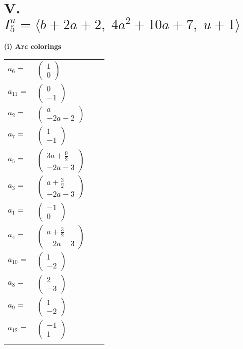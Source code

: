 \documentclass[1p]{elsarticle_modified}
\theoremstyle{definition}
\begin{document}
\centering \section*{V. $I^u_{5}= \langle b+2 a+2,\;4 a^2+10 a+7,\;u+1 \rangle$}
\flushleft \textbf{(i) Arc colorings}\\
\begin{tabular}{m{7pt} m{180pt} m{7pt} m{180pt} }
\flushright $a_{6}=$&$\begin{pmatrix}1\\0\end{pmatrix}$ \\
\flushright $a_{11}=$&$\begin{pmatrix}0\\-1\end{pmatrix}$ \\
\flushright $a_{2}=$&$\begin{pmatrix}a\\-2 a-2\end{pmatrix}$ \\
\flushright $a_{7}=$&$\begin{pmatrix}1\\-1\end{pmatrix}$ \\
\flushright $a_{5}=$&$\begin{pmatrix}3 a+\frac{9}{2}\\-2 a-3\end{pmatrix}$ \\
\flushright $a_{3}=$&$\begin{pmatrix}a+\frac{3}{2}\\-2 a-3\end{pmatrix}$ \\
\flushright $a_{1}=$&$\begin{pmatrix}-1\\0\end{pmatrix}$ \\
\flushright $a_{4}=$&$\begin{pmatrix}a+\frac{3}{2}\\-2 a-3\end{pmatrix}$ \\
\flushright $a_{10}=$&$\begin{pmatrix}1\\-2\end{pmatrix}$ \\
\flushright $a_{8}=$&$\begin{pmatrix}2\\-3\end{pmatrix}$ \\
\flushright $a_{9}=$&$\begin{pmatrix}1\\-2\end{pmatrix}$ \\
\flushright $a_{12}=$&$\begin{pmatrix}-1\\1\end{pmatrix}$\\&\end{tabular}
\end{document}
